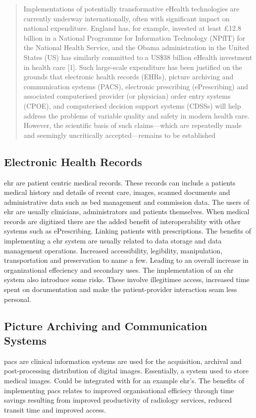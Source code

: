 \begin{quotation}
Implementations of potentially transformative eHealth technologies are currently underway internationally, often with significant impact on national expenditure. England has, for example, invested at least £12.8 billion in a National Programme for Information Technology (NPfIT) for the National Health Service, and the Obama administration in the United States (US) has similarly committed to a US\$38 billion eHealth investment in health care [1]. Such large-scale expenditure has been justified on the grounds that electronic health records (EHRs), picture archiving and communication systems (PACS), electronic prescribing (ePrescribing) and associated computerised provider (or physician) order entry systems (CPOE), and computerised decision support systems (CDSSs) will help address the problems of variable quality and safety in modern health care. However, the scientific basis of such claims—which are repeatedly made and seemingly uncritically accepted—remains to be established

\cite{ehealth:ashly}
\end{quotation}

\subsection{Electronic Health Records}
\gls{ehr} are patient centric medical records. 
These records can include a patients medical history and details of recent care, images, scanned documents and administrative data such as bed management and commission data.
The users of \gls{ehr} are usually clinicians, administrators and patients themselves. 
When medical records are digitized there are the added benefit of interoperability with other systems such as ePrescribing. 
Linking patients with prescriptions. 
The benefits of implementing a \gls{ehr} system are usually related to data storage and data management operations. Increased accessibility, legibility, manipulation, transportation and preservation to name a few. Leading to an overall increase in organizational effeciency and secondary uses. The implementation of an \gls{ehr} system also introduce some risks.
These involve illegitimee access, increased time spent on documentation and make the patient-provider interaction seam less personal.


\subsection{Picture Archiving and Communication Systems}
\gls{pacs} are clinical information systems are used for the acquisition, archival and post-processing distribution of digital images. 
Essentially, a system used to store medical images.
Could be integrated with for an example \gls{ehr}'s.
The benefits of implementing \gls{pacs} relates to improved organisational efficiecy through time savings resulting from improved productivity of radiology services, reduced transit time and improved access. 

